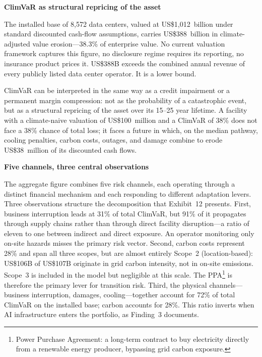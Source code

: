 \begin{twocolbody}

{\color{SEGreen}\textbf{ClimVaR as structural repricing of the asset}}

\vspace{1mm}

\noindent The installed base of 8{,}572 data centers, valued at US\$1{,}012~billion under standard discounted cash-flow assumptions, carries US\$388~billion in climate-adjusted value erosion---38.3\% of enterprise value. No current valuation framework captures this figure, no disclosure regime requires its reporting, no insurance product prices it. US\$388B exceeds the combined annual revenue of every publicly listed data center operator. It is a lower bound.

ClimVaR can be interpreted in the same way as a credit impairment or a permanent margin compression: not as the probability of a catastrophic event, but as a structural repricing of the asset over its 15--25 year lifetime. A facility with a climate-naive valuation of US\$100~million and a ClimVaR of 38\% does not face a 38\% chance of total loss; it faces a future in which, on the median pathway, cooling penalties, carbon costs, outages, and damage combine to erode US\$38~million of its discounted cash flows.

\vspace{5mm}

{\color{SEGreen}\textbf{Five channels, three central observations}}

\vspace{1mm}

\noindent The aggregate figure combines five risk channels, each operating through a distinct financial mechanism and each responding to different adaptation levers. Three observations structure the decomposition that Exhibit~12 presents. First, business interruption leads at 31\% of total ClimVaR, but 91\% of it propagates through supply chains rather than through direct facility disruption---a ratio of eleven to one between indirect and direct exposure. An operator monitoring only on-site hazards misses the primary risk vector. Second, carbon costs represent 28\% and span all three scopes, but are almost entirely Scope~2 (location-based): US\$106B of US\$107B originate in grid carbon intensity, not in on-site emissions. Scope~3 is included in the model but negligible at this scale. The PPA\footnote{Power Purchase Agreement: a long-term contract to buy electricity directly from a renewable energy producer, bypassing grid carbon exposure.} is therefore the primary lever for transition risk. Third, the physical channels---business interruption, damages, cooling---together account for 72\% of total ClimVaR on the installed base; carbon accounts for 28\%. This ratio inverts when AI infrastructure enters the portfolio, as Finding~3 documents.


\end{twocolbody}
